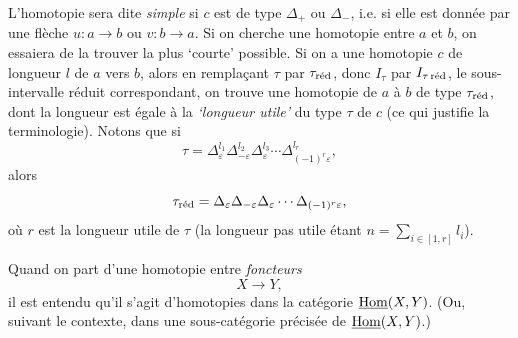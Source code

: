 L'homotopie sera dite \textit{simple} si $c$ est de type $\Delta_{+}$ ou $\Delta_{-}$, i.e. si elle est donnée par une flèche $u : a \longrightarrow b$ ou $v : b \longrightarrow a$. Si on cherche une homotopie entre $a$ et $b$, on essaiera de la trouver la plus `courte' possible. Si on a une homotopie $c$ de longueur $l$ de $a$ vers $b$, alors en remplaçant $\tau$ par $\tau_{\mathrm{r\acute{e}d}}$, donc $I_{\tau}$ par $I_{\tau\,\mathrm{r\acute{e}d}}$, le sous-intervalle réduit
correspondant, on trouve une homotopie de $a$ à $b$ de type $\tau_{\mathrm{r\acute{e}d}}$, dont la longueur est égale à la \textit{`longueur utile'} du type $\tau$ de $c$ (ce qui justifie la terminologie). Notons que si
\[
\tau = \Delta_{\varepsilon}^{l_1}\Delta_{-\varepsilon}^{l_2}\Delta_{\varepsilon}^{l_3}\cdots\Delta_{(-1)^{r}\varepsilon}^{l_r},
\]
alors
\[
\tau_{\mathrm{r\acute{e}d}} = \Delta_{\varepsilon}\Delta_{-\varepsilon}\Delta_{\varepsilon}\cdots\Delta_{(-1)^{r}\varepsilon},
\]
 où $r$ est la longueur utile de $\tau$ (la longueur pas utile étant $n = \sum\limits_{i\in[1,r]} l_i$).

Quand on part d'une homotopie entre \textit{foncteurs}
\[
X \longrightarrow Y,
\]
il est entendu qu'il s'agit d'homotopies dans la catégorie $\underline{\mathrm{Hom}}(X,Y)$. (Ou, suivant le contexte, dans une sous-catégorie précisée de $\underline{\mathrm{Hom}}(X,Y)$.)

